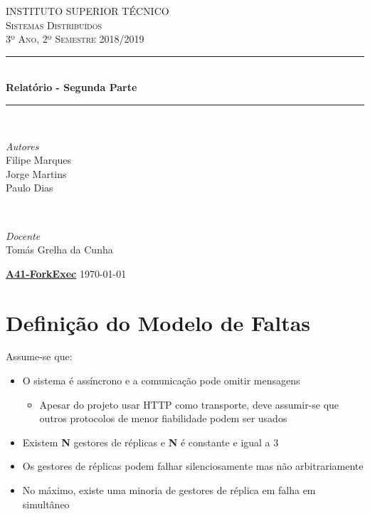 \documentclass[a4paper]{article}
\begin{document}
\begin{titlepage}
	\newcommand{\HRule}{\rule{\linewidth}{0.5mm}}
	\center
	\textsc{\LARGE INSTITUTO SUPERIOR TÉCNICO}\\[1.0cm]
	\textsc{\Large Sistemas Distribuídos}\\[0.5cm]
	\textsc{\large 3º Ano, 2º Semestre 2018/2019}\\[0.2cm]
	
	\HRule\\[0.4cm]
	{\huge\bfseries Relatório - Segunda Parte}\\[0.2cm]
	\HRule\\[1.5cm]
	
	\begin{minipage}{0.4\textwidth}
		\begin{flushleft}
		\large
		\textit{Autores}\\
		Filipe Marques\\
		Jorge Martins\\
		Paulo Dias
		\end{flushleft}
	\end{minipage}
	~
	\begin{minipage}{0.4\textwidth}
		\begin{flushright}
		\large
		\textit{Docente}\\
		Tomás Grelha da Cunha
		\end{flushright}
	\end{minipage}
	
	\vfill
	\large\href{https://github.com/tecnico-distsys/A41-ForkExec}{\textbf{A41-ForkExec}}
	\vfill
	{\large\today}
	\vfill
\end{titlepage}

\begin{titlepage}

\tableofcontents
\end{titlepage}

\section{Definição do Modelo de Faltas}
Assume-se que:
\begin{itemize}
\item O sistema é assíncrono e a comunicação pode omitir mensagens
\begin{itemize}
\item Apesar do projeto usar HTTP como transporte, deve assumir-se que outros protocolos  de menor fiabilidade podem ser usados
\end{itemize}
\item Existem \textbf{N} gestores de réplicas e \textbf{N} é constante e igual a 3
\item Os gestores de réplicas podem falhar silenciosamente mas não arbitrariamente
\item No máximo, existe uma minoria de gestores de réplica em falha em simultâneo
\end{itemize}
\end{document}
